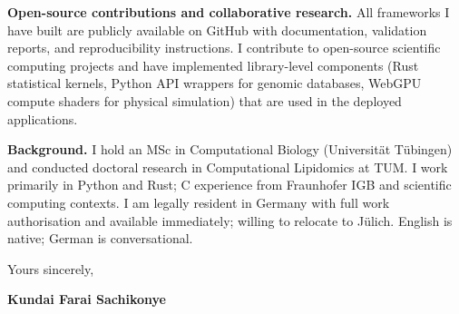 \documentclass[12pt,a4paper]{article}
\begin{document}
\textbf{Open-source contributions and collaborative research.}
All frameworks I have built are publicly available on GitHub with documentation,
validation reports, and reproducibility instructions. I contribute to
open-source scientific computing projects and have implemented library-level
components (Rust statistical kernels, Python API wrappers for genomic
databases, WebGPU compute shaders for physical simulation) that are used
in the deployed applications.

\textbf{Background.}
I hold an MSc in Computational Biology (Universität Tübingen) and conducted
doctoral research in Computational Lipidomics at TUM. I work primarily in
Python and Rust; C experience from Fraunhofer IGB and scientific computing
contexts. I am legally resident in Germany with full work authorisation and
available immediately; willing to relocate to Jülich.
English is native; German is conversational.

\vspace{1.5em}
Yours sincerely,

\vspace{2.5em}
\textbf{Kundai Farai Sachikonye}
\end{document}
